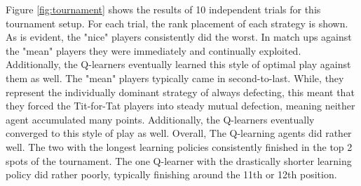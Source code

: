 \documentclass[12pt]{amsart}
\newcommand{\0}{\mat{0}}
\newcommand{\1}{\mathds{1}}
\begin{document}
Figure \ref{fig:tournament} shows the results of 10 independent trials for this tournament setup.  For each trial, the rank placement of each strategy is shown.  As is evident, the "nice" players consistently did the worst.  In match ups against the "mean" players they were immediately and continually exploited.  Additionally, the Q-learners eventually learned this style of optimal play against them as well.  The "mean" players typically came in second-to-last.  While, they represent the individually dominant strategy of always defecting, this meant that they forced the Tit-for-Tat players into steady mutual defection, meaning neither agent accumulated many points.  Additionally, the Q-learners eventually converged to this style of play as well.  Overall, The Q-learning agents did rather well.  The two with the longest learning policies consistently finished in the top 2 spots of the tournament.  The one Q-learner with the drastically shorter learning policy did rather poorly, typically finishing around the 11th or 12th position.


 

\end{document}
